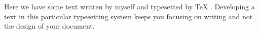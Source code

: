 \usepackage{marginnote}


Here we have some text written by myself and typesetted by {\TeX}
. Developing a text in
this particular typesetting system keeps you focusing on writing and not the
design of your document.
